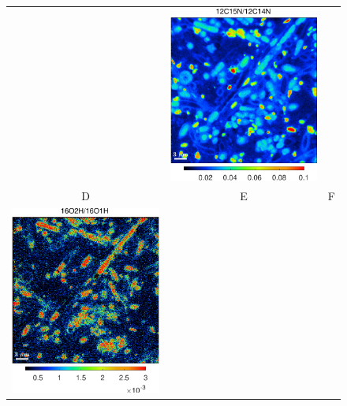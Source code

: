 \begin{figure}[!ht]
\begin{tabular}{ccc}
&
\includegraphics[scale=\scf, valign=t]{figs8/12C15N-12C14N}
\\
D & E & F\\
\includegraphics[scale=\scf, valign=t]{figs8/16O2H-16O1H}

\end{tabular}
\end{figure}
